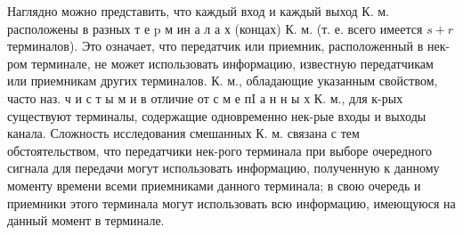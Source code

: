 \documentclass[10pt]{article}
\begin{document}
Наглядно можно представить, что каждый вход и каждый выход К. м. расположены в разных т е p м ин а л а х (концах) К. м. (т. е. всего имеется $s+r$ терминалов). Это означает, что передатчик или приемник, расположенный в нек-ром терминале, не может использовать информацию, известную передатчикам или приемникам других терминалов. К. м., обладающие указанным свойством, часто наз. ч и с т ы м и в отличие от с м е пI а н н ы х К. м., для к-рых существуют терминалы, содержащие одновременно нек-рые входы и выходы канала. Сложность исследования смешанных К. м. связана с тем обстоятельством, что передатчики нек-рого терминала при выборе очередного сигнала для передачи могут использовать информацию, полученную к данному моменту времени всеми приемниками данного терминала; в свою очередь и приемники этого терминала могут использовать всю информацию, имеющуюся на данный момент в терминале.
\end{document}
